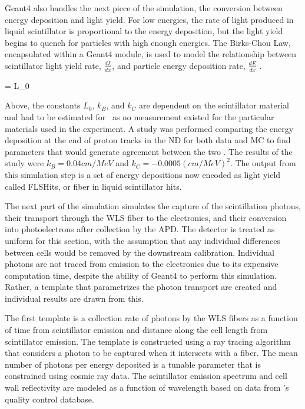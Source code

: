 Geant4 also handles the next piece of the simulation, the conversion between energy deposition and light yield. For low energies, the rate of light produced in liquid scintillator is proportional to the energy deposition, but the light yield begins to quench for particles with high enough energies. The Birks-Chou Law, encapsulated within a Geant4 module, is used to model the relationship between scintillator light yield rate, $\frac{dL}{dx}$, and particle energy deposition rate, $\frac{dE}{dx}$ \cite{ref:BirksChou}.

\beq
{} = L_0  
\label{eq:BirksChou}
\eeq

\n Above, the constants $L_0$, $k_B$, and $k_C$ are dependent on the scintillator material and had to be estimated for \nova~as no measurement existed for the particular materials used in the experiment. A study was performed comparing the energy deposition at the end of proton tracks in the ND for both data and MC to find parameters that would generate agreement between the two \cite{ref:DanBirks}. The results of the study were $k_B = 0.04\unit{cm/MeV}$ and $k_C = -0.0005\unit{(cm/MeV)}^2$. The output from this simulation step is a set of energy depositions now encoded as light yield called FLSHits, or fiber in liquid scintillator hits.


The next part of the simulation simulates the capture of the scintillation photons, their transport through the WLS fiber to the electronics, and their conversion into photoelectrons after collection by the APD. The detector is treated as uniform for this section, with the assumption that any individual differences between cells would be removed by the downstream calibration. Individual photons are not traced from emission to the electronics due to its expensive computation time, despite the ability of Geant4 to perform this simulation. Rather, a template that parametrizes the photon transport are created and individual results are drawn from this.

The first template is a collection rate of photons by the WLS fibers as a function of time from scintillator emission and distance along the cell length from scintillator emission. The template is constructed using a ray tracing algorithm that considers a photon to be captured when it intersects with a fiber.  The mean number of photons per energy deposited is a tunable parameter that is constrained using cosmic ray data. The scintillator emission spectrum and cell wall reflectivity are modeled as a function of wavelength based on data from \nova's quality control database.

